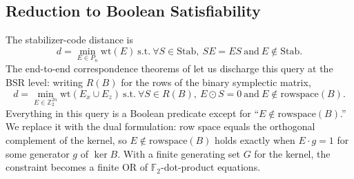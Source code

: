 \subsection{Reduction to Boolean Satisfiability}
\label{sec:distproblem}
\label{sec:translation}

%
%
%
%

The stabilizer-code distance is
$$d = \min_{E \in P_n} \mathrm{wt}(E)\ \text{s.t.}\ \forall S \in \text{Stab},\
SE = ES \ \text{and}\ E \notin \text{Stab}.$$
The end-to-end correspondence theorems of  let us
discharge this query at the BSR level: writing $R(B)$ for the rows of the binary
symplectic matrix,
$$d = \min_{E \in \mathbb{Z}_2^{2n}} \mathrm{wt}(E_x \cup E_z)\ \text{s.t.}\
\forall S \in R(B),\ E \odot S = 0 \ \text{and}\ E \notin
\mathrm{rowspace}(B).$$
Everything in this query is a Boolean predicate except for ``$E \notin
\mathrm{rowspace}(B)$.'' We replace it with the dual formulation: row space
equals the orthogonal complement of the kernel, so $E \notin
\mathrm{rowspace}(B)$ holds exactly when $E \cdot g = 1$ for some generator $g$
of $\ker B$. With a finite generating set $G$ for the kernel, the constraint
becomes a finite OR of $\mathbb{F}_2$-dot-product equations.

